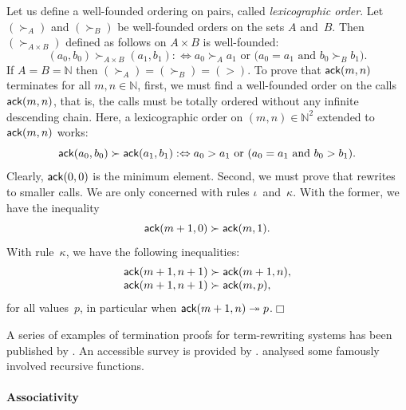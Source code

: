 Let us define a well\hyp{}founded ordering on pairs, called
\emph{lexicographic order}. Let
\((\succ_A)\) and \((\succ_B)\) be well\hyp{}founded orders on the
sets \(A\) and~\(B\). Then \((\succ_{A \times B})\) defined as follows
on \(A \times B\) is well\hyp{}founded:
\begin{equation}
(a_0,b_0) \succ_{A \times B} (a_1,b_1) :\Leftrightarrow \text{\(a_0
    \succ_A a_1\) or (\(a_0 = a_1\) and \(b_0 \succ_B b_1\)).}
\label{def:lexico}
\end{equation}
If \(A=B=\mathbb{N}\) then \((\succ_A) = (\succ_B) = (>)\). To prove
that \(\textsf{ack}(m,n)\) terminates for all \(m,n \in \mathbb{N}\),
first, we must find a well\hyp{}founded order on the calls
\(\textsf{ack}(m,n)\), that is, the calls must be totally ordered without
any infinite descending chain. Here, a lexicographic order on \((m,n)
\in \mathbb{N}^2\) extended to \(\textsf{ack}(m,n)\) works:
\begin{equation*}
\textsf{ack}(a_0,b_0) \succ \textsf{ack}(a_1,b_1) :\Leftrightarrow
\text{\(a_0 > a_1\) or (\(a_0 = a_1\) and \(b_0 > b_1\)).}
\end{equation*}
Clearly, \(\textsf{ack}(0,0)\) is the minimum element. Second, we must
prove that  rewrites to smaller calls. We are only
concerned with rules \(\iota\)~and~\(\kappa\). With the former, we
have the inequality
\begin{equation*}
  \textsf{ack}(m+1,0) \succ \textsf{ack}(m,1).
\end{equation*}
With rule~\(\kappa\), we have the following inequalities:
\begin{equation*}
  \begin{array}{@{}r@{\;}l@{\;}l@{}}
    \fun{ack}(m+1,n+1) & \succ & \fun{ack}(m+1,n),\\
    \fun{ack}(m+1,n+1) & \succ & \fun{ack}(m,p),
  \end{array}
\end{equation*}
for all values~\(p\), in particular when \(\textsf{ack}(m+1,n)
\twoheadrightarrow p\).\hfill\(\Box\)

A series of examples of termination proofs for term\hyp{}rewriting systems has been
published by \cite{Dershowitz_1995,ArtsGiesl_2001}. An accessible
survey is provided by \cite{Dershowitz_1987}. \cite{Knuth_2000a}
analysed some famously involved recursive functions.

\paragraph{Associativity}
\label{proof:assoc_cat}

